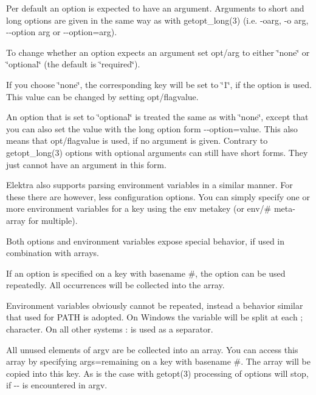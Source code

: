 Per default an option is expected to have an argument. Arguments to short and long options are given in the same way as with {\ttfamily getopt\+\_\+long(3)} (i.\+e. {\ttfamily -\/oarg}, {\ttfamily -\/o arg}, {\ttfamily -\/-\/option arg} or {\ttfamily -\/-\/option=arg}).

To change whether an option expects an argument set {\ttfamily opt/arg} to either {\ttfamily \char`\"{}none\char`\"{}} or {\ttfamily \char`\"{}optional\char`\"{}} (the default is {\ttfamily \char`\"{}required\char`\"{}}).


\begin{DoxyItemize}
\item If you choose {\ttfamily \char`\"{}none\char`\"{}}, the corresponding key will be set to {\ttfamily \char`\"{}1\char`\"{}}, if the option is used. This value can be changed by setting {\ttfamily opt/flagvalue}.
\item An option that is set to {\ttfamily \char`\"{}optional\char`\"{}} is treated the same as with {\ttfamily \char`\"{}none\char`\"{}}, except that you can also set the value with the long option form {\ttfamily -\/-\/option=value}. This also means that {\ttfamily opt/flagvalue} is used, if no argument is given. Contrary to {\ttfamily getopt\+\_\+long(3)} options with optional arguments can still have short forms. They just cannot have an argument in this form.
\end{DoxyItemize}

Elektra also supports parsing environment variables in a similar manner. For these there are however, less configuration options. You can simply specify one or more environment variables for a key using the {\ttfamily env} metakey (or {\ttfamily env/\#} meta-\/array for multiple).

Both options and environment variables expose special behavior, if used in combination with arrays.

If an option is specified on a key with basename {\ttfamily \#}, the option can be used repeatedly. All occurrences will be collected into the array.

Environment variables obviously cannot be repeated, instead a behavior similar that used for P\+A\+TH is adopted. On Windows the variable will be split at each \textquotesingle{};\textquotesingle{} character. On all other systems \textquotesingle{}\+:\textquotesingle{} is used as a separator.

All unused elements of {\ttfamily argv} are be collected into an array. You can access this array by specifying {\ttfamily args=remaining} on a key with basename {\ttfamily \#}. The array will be copied into this key. As is the case with getopt(3) processing of options will stop, if {\ttfamily -\/-\/} is encountered in {\ttfamily argv}.

